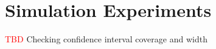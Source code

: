 \chapter{Simulation Experiments}\label{experiments}

\textcolor{red}{TBD} Checking confidence interval coverage and width

